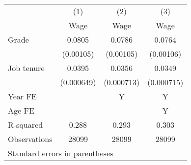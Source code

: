\begin{tabular}{l*{3}{c}}
\hline\hline
                    &\multicolumn{1}{c}{(1)}&\multicolumn{1}{c}{(2)}&\multicolumn{1}{c}{(3)}\\
                    &\multicolumn{1}{c}{Wage}&\multicolumn{1}{c}{Wage}&\multicolumn{1}{c}{Wage}\\
\hline
Grade               &      0.0805&      0.0786&      0.0764\\
                    &   (0.00105)&   (0.00105)&   (0.00106)\\
[1em]
Job tenure          &      0.0395&      0.0356&      0.0349\\
                    &  (0.000649)&  (0.000713)&  (0.000715)\\
\hline
Year FE             &            &           Y&           Y\\
Age FE              &            &            &           Y\\
R-squared           &       0.288&       0.293&       0.303\\
Observations        &       28099&       28099&       28099\\
\hline\hline
\multicolumn{4}{l}{\footnotesize Standard errors in parentheses}\\
\end{tabular}
